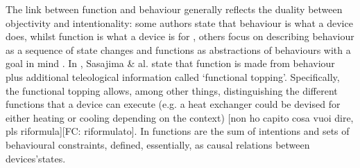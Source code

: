 \documentclass[sw]{iosart2x}
\newcommand{\quotes}[1]{`#1'}
\newcommand{\TODO}[1]{{\color{red} #1}}
\begin{document}
The link between function and behaviour generally reflects the duality between objectivity and intentionality: some authors state that behaviour is what a device does, whilst function is what a device is for \cite{kleer_qualitative_1984}, others focus on describing behaviour as a sequence of state changes and functions as abstractions of behaviours with a goal in mind \cite{umedaFunctionBehaviourStructure1990}.  
In \cite{sasajimaFBRLFunctionBehavior1995, sasajimaInvestigationDomainOntology1994}, Sasajima \& al. state that function is made from behaviour plus additional teleological information called \quotes{functional topping}.
Specifically, the functional topping allows, among other things, distinguishing the different functions that a device can execute (e.g. a heat exchanger could be devised for either heating or cooling depending on the context)%
\TODO{[non ho capito cosa vuoi dire, pls riformula][FC: riformulato]}. 
In \cite{chandrasekaranFunctionDeviceRepresentation2000} functions are the sum of intentions and sets of behavioural constraints, defined, essentially, as causal relations between devices'states.

\end{document}
